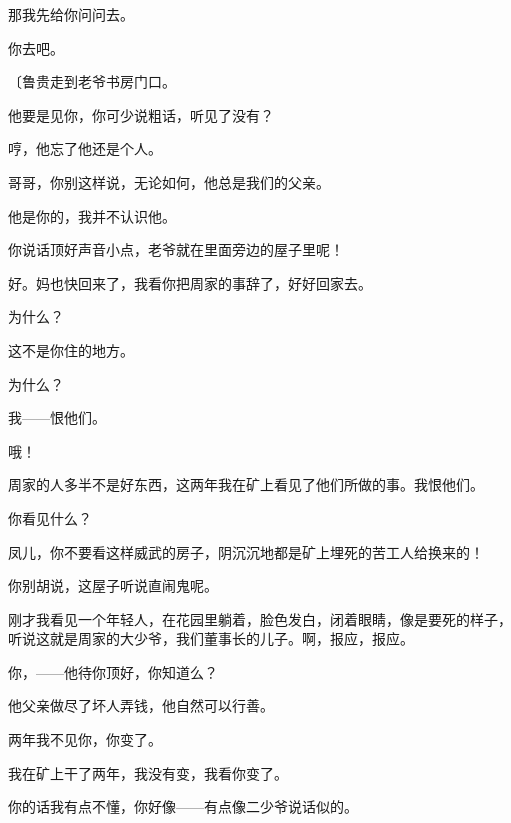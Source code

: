 那我先给你问问去。

你去吧。

{\fangsong〔鲁贵走到老爷书房门口。}

他要是见你，你可少说粗话，听见了没有？


哼，他忘了他还是个人。

哥哥，你别这样说，无论如何，他总是我们的父亲。

他是你的，我并不认识他。

你说话顶好声音小点，老爷就在里面旁边的屋子里呢！

好。妈也快回来了，我看你把周家的事辞了，好好回家去。

为什么？

这不是你住的地方。

为什么？

我——恨他们。

哦！

周家的人多半不是好东西，这两年我在矿上看见了他们所做的事。我恨他们。

你看见什么？

凤儿，你不要看这样威武的房子，阴沉沉地都是矿上埋死的苦工人给换来的！

你别胡说，这屋子听说直闹鬼呢。

刚才我看见一个年轻人，在花园里躺着，脸色发白，闭着眼睛，像是要死的样子，听说这就是周家的大少爷，我们董事长的儿子。啊，报应，报应。

你，——他待你顶好，你知道么？

他父亲做尽了坏人弄钱，他自然可以行善。

两年我不见你，你变了。

我在矿上干了两年，我没有变，我看你变了。

你的话我有点不懂，你好像——有点像二少爷说话似的。

